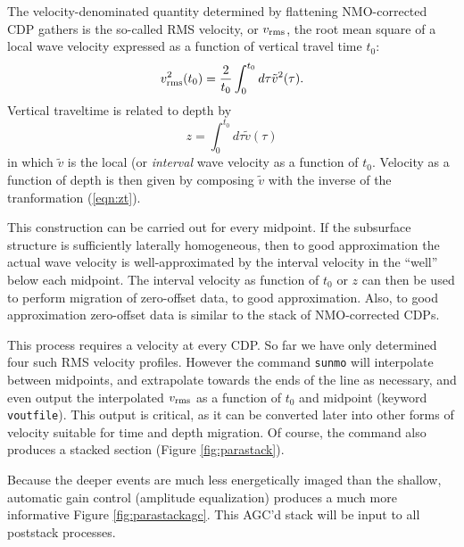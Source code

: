 The velocity-denominated quantity determined by flattening NMO-corrected CDP gathers is the so-called RMS velocity, or $v_{\rm rms}$, the root mean square of a local wave velocity expressed as a function of vertical travel time $t_0$:
\begin{equation}
\label{eqn:vrms}
v_{\rm rms}^2(t_0)= \frac{2}{t_0}\int_0^{t_0} d\tau \tilde{v}^2(\tau).
\end{equation}
Vertical traveltime is related to depth by 
\begin{equation}
\label{eqn:zt}
z=\int_0^{t_0}d\tau\tilde{v}(\tau)
\end{equation}
in which $\tilde{v}$ is the local (or {\em interval} wave velocity as a function of $t_0$. Velocity as a function of depth is then given by composing $\tilde{v}$ with the inverse of the tranformation (\ref{eqn:zt}). 

This construction can be carried out for every midpoint. If the subsurface structure is sufficiently laterally homogeneous, then to good approximation the actual wave velocity is well-approximated by the interval velocity in the ``well'' below each midpoint. The interval velocity as function of $t_0$ or $z$ can then be used to perform migration of zero-offset data, to good approximation. Also, to good approximation zero-offset data is similar to the stack of NMO-corrected CDPs.

This process requires a velocity at every CDP. So far we have only determined four such RMS velocity profiles. However the command {\tt sunmo} will interpolate between 
midpoints, and extrapolate towards the ends of the line as necessary, and even output the interpolated $v_{\rm rms}$ as a function of $t_0$ and midpoint (keyword {\tt voutfile}). This output is critical, as it can be converted later into other forms of velocity suitable for time and depth migration. Of course, the command also produces a stacked section (Figure \ref{fig:parastack}). 


Because the deeper events are much less energetically imaged than the shallow, automatic gain control (amplitude equalization) produces a much more informative Figure \ref{fig:parastackagc}. This AGC'd stack will be input to all poststack processes.


